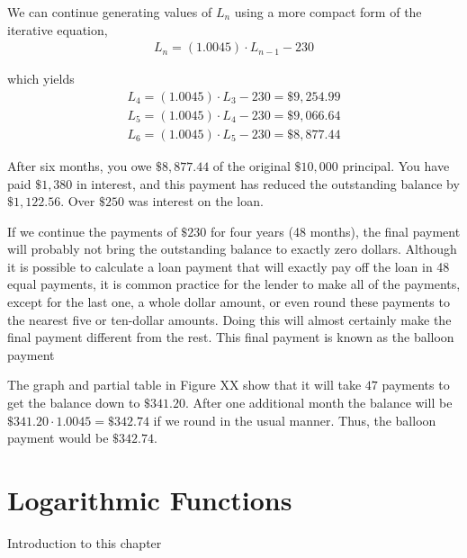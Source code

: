 \documentclass[10pt,]{book}
\theoremstyle{plain}
\theoremstyle{definition}
\theoremstyle{definition}
\numberwithin{equation}{section}
\begin{document}
\par
We can continue generating values of \(L_n\) using a more compact form of the iterative equation,%
%
\begin{gather*}
L_n=(1.0045)\cdot L_{n-1}-230
\end{gather*}
\par
which yields%
%
\begin{gather*}
L_4=(1.0045)\cdot L_3-230=\$9,254.99\\
L_5=(1.0045)\cdot L_4-230=\$9,066.64\\
L_6=(1.0045)\cdot L_5-230=\$8,877.44
\end{gather*}
\par
After six months, you owe \(\$8,877.44\) of the original \(\$10,000\) principal.  You have paid \(\$1,380\) in interest, and this payment has reduced the outstanding balance by \(\$1,122.56\).  Over \(\$250\) was interest on the loan.%
\par
If we continue the payments of \(\$230\) for four years (48 months), the final payment will probably not bring the outstanding balance to exactly zero dollars.  Although it is possible to calculate a loan payment that will exactly pay off the loan in 48 equal payments, it is common practice for the lender to make all of the payments, except for the last one, a whole dollar amount, or even round these payments to the nearest five or ten-dollar amounts. Doing this will almost certainly make the final payment different from the rest.  This final payment is known as the balloon payment%
\par
The graph and partial table in Figure XX show that it will take \(47\) payments to get the balance down to \(\$341.20\).  After one additional month the balance will be \(\$341.20\cdot 1.0045=\$342.74\) if we round in the usual manner.  Thus, the balloon payment would be \(\$342.74\).%
\typeout{************************************************}
\typeout{************************************************}
\chapter[{Logarithmic Functions}]{Logarithmic Functions}\label{chapter05}
\typeout{************************************************}
\typeout{************************************************}
Introduction to this chapter%
\typeout{************************************************}
\typeout{************************************************}
\end{document}
